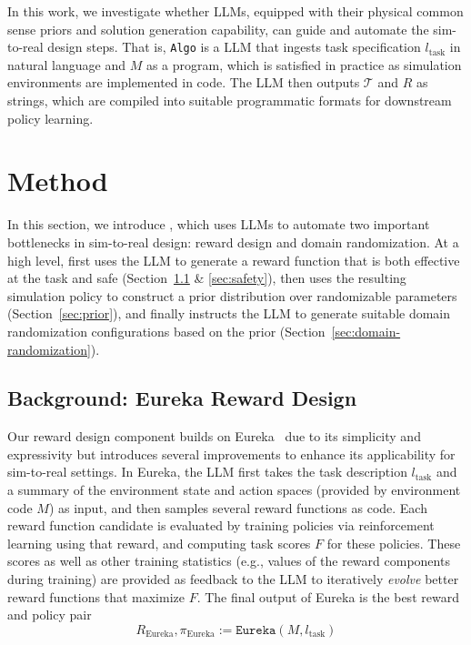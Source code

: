 \documentclass[conference]{IEEEtran}
\begin{document}
In this work, we investigate whether LLMs, equipped with their physical common sense priors and solution generation capability, can guide and automate the sim-to-real design steps. That is, \texttt{Algo} is a LLM that ingests task specification $l_{\text{task}}$ in natural language and $M$ as a program, which is satisfied in practice as simulation environments are implemented in code. The LLM then outputs $\mathcal{T}$ and $R$ as strings, which are compiled into suitable programmatic formats for downstream policy learning.

\section{Method}
In this section, we introduce \ourmethod, which uses LLMs to automate two important bottlenecks in sim-to-real design: reward design and domain randomization. At a high level, \ourmethod first uses the LLM to generate a reward function that is both effective at the task and safe (Section~\ref{sec:reward} \& \ref{sec:safety}), then uses the resulting simulation policy to construct a prior distribution over randomizable parameters (Section~\ref{sec:prior}), and finally instructs the LLM to generate suitable domain randomization configurations based on the prior (Section~\ref{sec:domain-randomization}).


\subsection{Background: Eureka Reward Design}
\label{sec:reward}
Our reward design component builds on Eureka~\citep{ma2023eureka} due to its simplicity and expressivity but introduces several improvements to enhance its applicability for sim-to-real settings. In Eureka, the LLM first takes the task description $l_{\text{task}}$ and a summary of the environment state and action spaces (provided by environment code $M$) as input, and then samples several reward functions as code. Each reward function candidate is evaluated by training policies via reinforcement learning using that reward, and computing task scores $F$ for these policies. These scores as well as other training statistics (e.g., values of the reward components during training) are provided as feedback to the LLM to iteratively \textit{evolve} better reward functions that maximize $F$. The final output of Eureka is the best reward and policy pair 
\begin{equation}
    R_{\text{Eureka}}, \pi_{\text{Eureka}} := \texttt{Eureka}(M, l_{\text{task}}) 
\end{equation}
\end{document}
